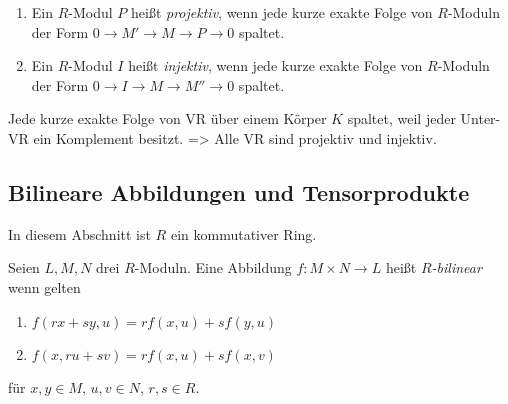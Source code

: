 \documentclass[../main.tex]{subfiles}
\begin{document}
\begin{definition}$ $
    \begin{enumerate}[label=\alph*)]
        \item 
        Ein $R$-Modul $P$ heißt \emph{projektiv}, wenn jede kurze exakte Folge von $R$-Moduln der Form $0\rightarrow M' \rightarrow M \rightarrow P\rightarrow 0$ spaltet.
        \item 
        Ein $R$-Modul $I$ heißt \emph{injektiv}, wenn jede kurze exakte Folge von $R$-Moduln der Form $0\rightarrow I\rightarrow M \rightarrow M'' \rightarrow 0$ spaltet.
    \end{enumerate}
\end{definition}

\begin{remark}
    Jede kurze exakte Folge von VR über einem Körper $K$ spaltet, weil jeder Unter-VR ein Komplement besitzt.
    => Alle VR sind projektiv und injektiv.
\end{remark}

\subsection{Bilineare Abbildungen und Tensorprodukte}
In diesem Abschnitt ist $R$ ein kommutativer Ring.
\begin{definition}
    Seien $L,M,N$ drei $R$-Moduln.
    Eine Abbildung $f:M\times N\rightarrow L$ heißt \emph{$R$-bilinear} wenn gelten
    \begin{enumerate}
        \item $f(rx+sy,u) = rf(x,u)+sf(y,u)$
        \item $f(x,ru+sv) = rf(x,u) + sf(x,v)$
    \end{enumerate}
    für $x,y\in M$, $u,v \in N$, $r,s\in R$.
\end{definition}
\end{document}
